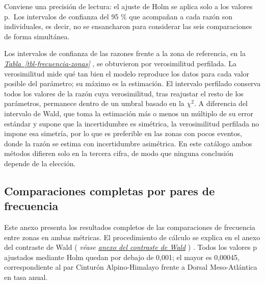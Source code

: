 \documentclass[
  spanish,
  letterpaper,
  DIV=11,
  numbers=noendperiod]{scrartcl}
\newcommand{\asesoriaStyledRef}[1]{%
  {\hypersetup{linkcolor=asesoriaLinkColor,urlcolor=asesoriaLinkColor,citecolor=asesoriaLinkColor}\textcolor{asesoriaLinkColor}{\emph{#1}}}%
}
\newcommand{\asesoriaParenRef}[1]{%
  \textnormal{\textcolor{asesoriaTextColor}{(}}%
  {\hypersetup{linkcolor=asesoriaLinkColor,urlcolor=asesoriaLinkColor,citecolor=asesoriaLinkColor}\textcolor{asesoriaTextColor}{\emph{#1}}}%
  \textnormal{\textcolor{asesoriaTextColor}{)}}%
}
\newcommand{\asesoriaTableLink}[1]{\hyperref[#1]{Tabla~\ref*{#1}}}
\newcommand{\asesoriaTableRef}[1]{\asesoriaStyledRef{\asesoriaTableLink{#1}}}
\begin{document}
Conviene una precisión de lectura: el ajuste de Holm se aplica solo a
los valores p.~Los intervalos de confianza del 95 \% que acompañan a
cada razón son individuales, es decir, no se ensancharon para considerar
las seis comparaciones de forma simultánea.

Los intervalos de confianza de las razones frente a la zona de
referencia, en la \asesoriaTableRef{tbl-frecuencia-zonas}, se obtuvieron
por verosimilitud perfilada. La verosimilitud mide qué tan bien el
modelo reproduce los datos para cada valor posible del parámetro; su
máximo es la estimación. El intervalo perfilado conserva todos los
valores de la razón cuya verosimilitud, tras reajustar el resto de los
parámetros, permanece dentro de un umbral basado en la \(\chi^2\). A
diferencia del intervalo de Wald, que toma la estimación más o menos un
múltiplo de su error estándar y supone que la incertidumbre es
simétrica, la verosimilitud perfilada no impone esa simetría, por lo que
es preferible en las zonas con pocos eventos, donde la razón se estima
con incertidumbre asimétrica. En este catálogo ambos métodos difieren
solo en la tercera cifra, de modo que ninguna conclusión depende de la
elección.

\subsection{Comparaciones completas por pares de
frecuencia}\label{sec-anexo-pares-frecuencia}

Este anexo presenta los resultados completos de las comparaciones de
frecuencia entre zonas en ambas métricas. El procedimiento de cálculo se
explica en el anexo del contraste de Wald
\asesoriaParenRef{véase \hyperref[sec-anexo-wald]{anexo del contraste de Wald}}.
Todos los valores p ajustados mediante Holm quedan por debajo de 0,001;
el mayor es 0,00045, correspondiente al par Cinturón Alpino-Himalayo
frente a Dorsal Meso-Atlántica en tasa anual.
\end{document}
